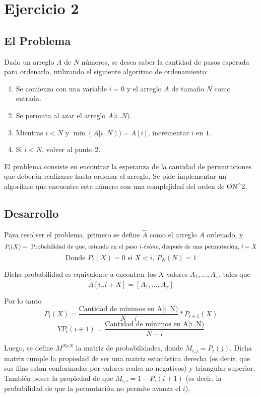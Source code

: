 \section{Ejercicio 2}
\subsection{El Problema}

Dado un arreglo $A$ de $N$ números, se desea saber la cantidad de pasos esperada para ordenarlo, utilizando el siguiente algoritmo de ordenamiento:
\begin{enumerate}
	\item Se comienza con una variable $i = 0$ y el arreglo $A$ de tamaño $N$ como entrada.
	\item Se permuta al azar el arreglo $A[i..N)$.
	\item Mientras $i < N$ y $\min(A[i..N)) = A[i]$, incrementar $i$ en $1$.
	\item Si $i < N$, volver al punto 2.
\end{enumerate}

El problema consiste en encontrar la esperanza de la cantidad de permutaciones que deberán realizarse hasta ordenar el arreglo. Se pide implementar un algoritmo que encuentre este número con una complejidad del orden de \O{N^2}.

\subsection{Desarrollo}
Para resolver el problema, primero se define $\widehat{A}$ como el arreglo $A$ ordenado, y
	 \[ P_i(X) = \text{ Probabilidad de que, estando en el paso \emph{i-ésimo}, después de una permutación, }i=X \]
 	 \[ \text{Donde }P_i(X) = 0\text{ si }X < i\text{, }P_N(N) = 1\]

Dicha probabilidad es equivalente a encontrar los $X$ valores $A_1,...,A_x$, tales que
 \[ \widehat{A}[i..i+X] = [A_1,...,A_x] \]

Por lo tanto
\[ P_i(X) = \frac{\text{Cantidad de mínimos en A[i..N)}}{N-i} * P_{i+1}(X) \]
\[ Y P_i(i+1) = \frac{\text{Cantidad de mínimos en A[i..N)}}{N-i}\]

Luego, se define $M^{NxN}$ la matriz de probabilidades, donde $M_{i,j} = P_i(j)$.
Dicha matriz cumple la propiedad de ser una matriz estocástica derecha (es decir, que sus filas estan conformadas por valores reales no negativos) y triangular superior.
También posee la propiedad de que $M_{i,i} = 1 - P_i(i+1)$ (es decir, la probabilidad de que la permutación no permite avanza el $i$).\\


